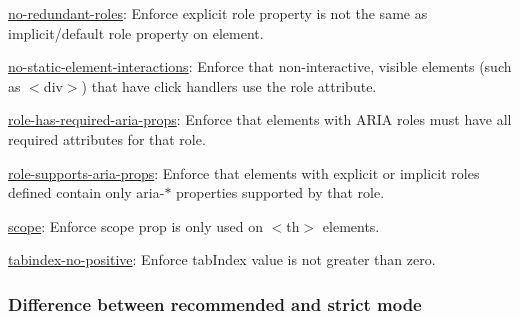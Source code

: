 \begin{DoxyItemize}
\item \mbox{\hyperlink{no-redundant-roles_8md}{no-\/redundant-\/roles}}\+: Enforce explicit role property is not the same as implicit/default role property on element.
\item \mbox{\hyperlink{no-static-element-interactions_8md}{no-\/static-\/element-\/interactions}}\+: Enforce that non-\/interactive, visible elements (such as {\ttfamily $<$div$>$}) that have click handlers use the role attribute.
\item \mbox{\hyperlink{role-has-required-aria-props_8md}{role-\/has-\/required-\/aria-\/props}}\+: Enforce that elements with A\+R\+IA roles must have all required attributes for that role.
\item \mbox{\hyperlink{role-supports-aria-props_8md}{role-\/supports-\/aria-\/props}}\+: Enforce that elements with explicit or implicit roles defined contain only {\ttfamily aria-\/$\ast$} properties supported by that {\ttfamily role}.
\item \mbox{\hyperlink{scope_8md}{scope}}\+: Enforce {\ttfamily scope} prop is only used on {\ttfamily $<$th$>$} elements.
\item \mbox{\hyperlink{tabindex-no-positive_8md}{tabindex-\/no-\/positive}}\+: Enforce {\ttfamily tab\+Index} value is not greater than zero.
\end{DoxyItemize}

\subsubsection*{Difference between \textquotesingle{}recommended\textquotesingle{} and \textquotesingle{}strict\textquotesingle{} mode}




